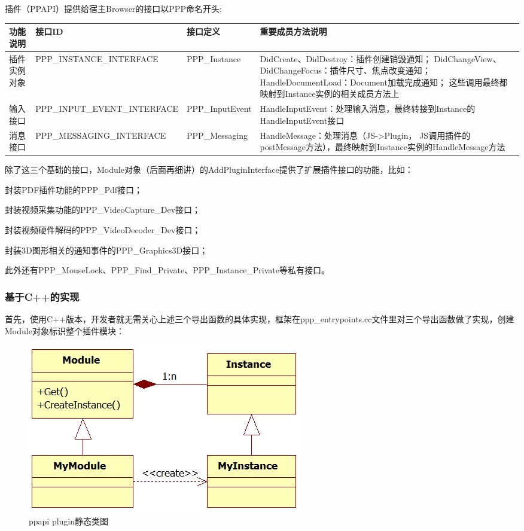 \clearpage
插件（PPAPI）提供给宿主Browser的接口以PPP命名开头:
\begin{center}
\scriptsize
\begin{tabular}{|l|p{5cm}|p{3cm}|p{5cm}|}
\hline
功能说明 & 接口ID & 接口定义 & 重要成员方法说明 \\
\hline  
插件实例对象 & PPP\_INSTANCE\_INTERFACE & PPP\_Instance & DidCreate、DidDestroy：插件创建销毁通知；
DidChangeView、DidChangeFocus：插件尺寸、焦点改变通知；
HandleDocumentLoad：Document加载完成通知；
这些调用最终都映射到Instance实例的相关成员方法上
\\
\hline
输入接口 & PPP\_INPUT\_EVENT\_INTERFACE & PPP\_InputEvent & HandleInputEvent：处理输入消息，最终转接到Instance的HandleInputEvent接口 \\
\hline
消息接口 & PPP\_MESSAGING\_INTERFACE & PPP\_Messaging & HandleMessage：处理消息（JS->Plugin， JS调用插件的postMessage方法），最终映射到Instance实例的HandleMessage方法 \\
\hline
\end{tabular}
\end{center}

除了这三个基础的接口，Module对象（后面再细讲）的AddPluginInterface提供了扩展插件接口的功能，比如：\par
封装PDF插件功能的PPP\_Pdf接口；\par
封装视频采集功能的PPP\_VideoCapture\_Dev接口；\par
封装视频硬件解码的PPP\_VideoDecoder\_Dev接口；\par
封装3D图形相关的通知事件的PPP\_Graphics3D接口；\par
此外还有PPP\_MouseLock、PPP\_Find\_Private、PPP\_Instance\_Private等私有接口。

\subsubsection{基于C++的实现}
首先，使用C++版本，开发者就无需关心上述三个导出函数的具体实现，框架在ppp\_entrypoints.cc文件里对三个导出函数做了实现，创建Module对象标识整个插件模块：
\begin{figure}[H] 
  \centering 
  \includegraphics[width=\textwidth]{image/ppapi/ppapi_class.jpg} 
  \caption{ppapi plugin静态类图}
\end{figure}

